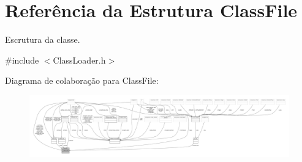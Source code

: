 \hypertarget{structClassFile}{}\section{Referência da Estrutura Class\+File}
\label{structClassFile}


Escrutura da classe.  




{\ttfamily \#include $<$Class\+Loader.\+h$>$}



Diagrama de colaboração para Class\+File\+:
\nopagebreak
\begin{figure}[H]
\begin{center}
\leavevmode
\includegraphics[width=350pt]{structClassFile__coll__graph}
\end{center}
\end{figure}
